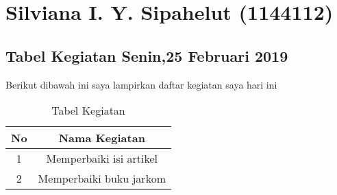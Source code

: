 \chapter{Silviana I. Y. Sipahelut (1144112)}
\section{Tabel Kegiatan Senin,25 Februari 2019}
Berikut dibawah ini saya lampirkan daftar kegiatan saya hari ini
\begin{table}[h]
\caption{Tabel Kegiatan}
\centering
\begin{tabular}{|c|c|}
\hline
No&Nama Kegiatan\\
\hline
1&Memperbaiki isi artikel\\
\hline
2&Memperbaiki buku jarkom\\
\hline
\end{tabular}
\label{table:Laporan kegiatan}
\end{table}